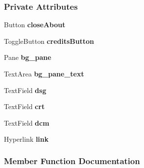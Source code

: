\subsubsection*{Private Attributes}
\begin{DoxyCompactItemize}
\item 
\mbox{\label{classCreditsController_aa48523b8f4bca93830db0718ad62e3f0}} 
Button {\bfseries close\+About}
\item 
\mbox{\label{classCreditsController_a09331111b282d43708fe33ec19363969}} 
Toggle\+Button {\bfseries credits\+Button}
\item 
\mbox{\label{classCreditsController_abbd930d6d2d02d5c2c156cdd75ae8357}} 
Pane {\bfseries bg\+\_\+pane}
\item 
\mbox{\label{classCreditsController_a903f75e25a8a1424ab42a9d96eff8e9e}} 
Text\+Area {\bfseries bg\+\_\+pane\+\_\+text}
\item 
\mbox{\label{classCreditsController_ad9a2b1aeca2241c82ef5f64f3d003126}} 
Text\+Field {\bfseries dsg}
\item 
\mbox{\label{classCreditsController_a2464d3e41f5f93c8ae1a65b093585a41}} 
Text\+Field {\bfseries crt}
\item 
\mbox{\label{classCreditsController_a43e82370fda323c95a98bb96cfa7c798}} 
Text\+Field {\bfseries dcm}
\item 
\mbox{\label{classCreditsController_ad2d8510cf65324b7cbe0b9074f57a9d9}} 
Hyperlink {\bfseries link}
\end{DoxyCompactItemize}


\subsubsection{Member Function Documentation}
\mbox{\label{classCreditsController_a30a25651d36cbea8bd963e42a908696b}} 
